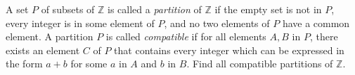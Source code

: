 A set $P$ of subsets of $\mathbb{Z}$ is called a \emph{partition} of $\mathbb{Z}$ if the empty set is not in $P$, every integer is in some element of $P$, and no two elements of $P$ have a common element. A partition $P$ is called \emph{compatible} if for all elements $A,B$ in $P$, there exists an element $C$ of $P$ that contains every integer which can be expressed in the form $a+b$ for some $a$ in $A$ and $b$ in $B$. Find all compatible partitions of $\mathbb{Z}$.